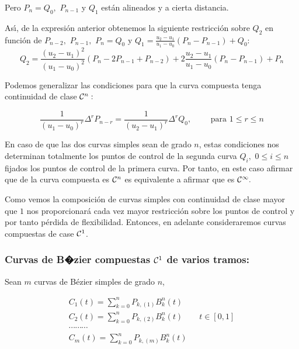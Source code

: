\documentclass[twoside]{report}
\begin{document}
Pero $P_n=Q_0,$ $P_{n-1}$ y $Q_1$ est\'{a}n alineados y a cierta distancia.

\vspace{0.2cm}

As\'{\i}, de la expresi\'{o}n anterior obtenemos la siguiente restricci\'{o}n sobre $Q_2$ en funci\'{o}n de  $P_{n-2},$ $P_{n-1},$ $P_n=Q_0$ y $\displaystyle Q_1=\frac{u_2-u_1}{u_1-u_0}(P_n-P_{n-1})+Q_0$:
$$Q_2=\frac{(u_2-u_1)^2}{(u_1-u_0)^2}(P_n-2P_{n-1}+P_{n-2})+2\frac{u_2-u_1}{u_1-u_0}(P_n-P_{n-1})+P_n$$


Podemos generalizar las condiciones para que la curva compuesta tenga continuidad de clase ${\cal C}^n:$

$$\frac{1}{(u_1-u_0)^r}\Delta^rP_{n-r}=\frac{1}{(u_2-u_1)^r}\Delta^r Q_0, \quad \quad \mbox{ para } 1\leq r\leq n$$

En caso de que las dos curvas simples sean de grado $n$, estas condiciones nos determinan totalmente los puntos de control de la segunda curva $Q_i,$ \quad $0\leq i\leq n$ fijados los puntos de control de la primera curva. Por tanto, en este caso afirmar que de la curva compuesta es ${\cal C}^n$ es equivalente a afirmar que es ${\cal C}^{\infty}.$

\vspace{0.2cm}

Como vemos la composici\'{o}n de curvas simples con continuidad de clase mayor que $1$ nos proporcionar\'{a} cada vez mayor restricci\'{o}n sobre los puntos de control y por tanto p\'{e}rdida de flexibilidad. Entonces, en adelante consideraremos curvas compuestas de case ${\cal C}^1$.

\subsubsection{Curvas de B�zier compuestas ${\cal C}^1$ de varios tramos:}

Sean $m$ curvas de B\'{e}zier simples de grado $n$,

$$\begin{array}{l}
C_1(t)=\sum_{k=0}^n P_{k, (1)} B_k^n(t)\\
C_2(t)=\sum_{k=0}^n P_{k, (2)} B_k^n(t) \quad \quad t\in [0,1]\\
\cdots \cdots \cdots\\
C_m(t)=\sum_{k=0}^n P_{k, (m)} B_k^n(t)\\
\end{array}$$
\end{document}
